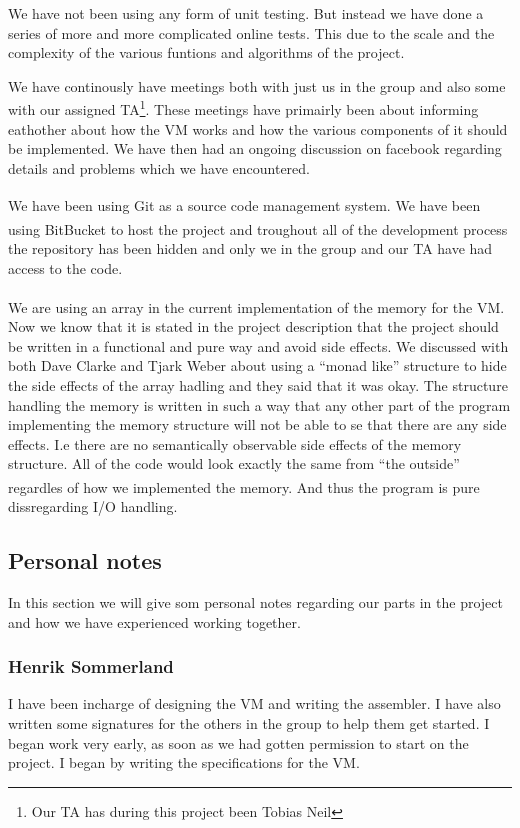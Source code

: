 \documentclass{article}
\begin{document}
We have not been using any form of unit testing. But instead we have done a
series of more and more complicated online tests. This due to the scale and the
complexity of the various funtions and algorithms of the project.

We have continously have meetings both with just us in the group and also some
with our assigned TA\footnote{Our TA has during this project been Tobias Neil}.
These meetings have primairly been about informing eathother about how the 
VM works and how the various components of it should be
implemented. We have then had an ongoing discussion on facebook regarding
details and problems which we have encountered.

We have been using Git\textsuperscript{\cite{git}} as a source code management
system. We have been using BitBucket\textsuperscript{\cite{bitbucket}} to
host the project and troughout all of the development process the repository has 
been hidden and only we in the group and our TA have had access to the code.\\
\\
We are using an array in the current implementation of the memory for the VM.
Now we know that it is stated in the project description that the project should
be written in a functional and pure way and avoid side effects. We discussed
with both Dave Clarke and Tjark Weber about using a ``monad like'' structure 
to hide the side effects of the array hadling and they said that it was okay.
The structure handling the memory is written in such a way that any other part
of the program implementing the memory structure will not be able to se that there
are any side effects. I.e there are no semantically observable side effects of 
the memory structure. All of the code would look exactly the same from ``the
outside'' regardles of how we implemented the memory. And thus the program is
pure\textsuperscript{\cite{pure}} dissregarding I/O handling.

\subsection{Personal notes}
In this section we will give som personal notes regarding our parts in the
project and how we have experienced working together.
\subsubsection{Henrik Sommerland}
I have been incharge of designing the VM and writing the assembler. I have also
written some signatures for the others in the group to help them get started. I
began work very early, as soon as we had gotten permission to start on the
project. I  began by writing the specifications for the VM.
\end{document}
